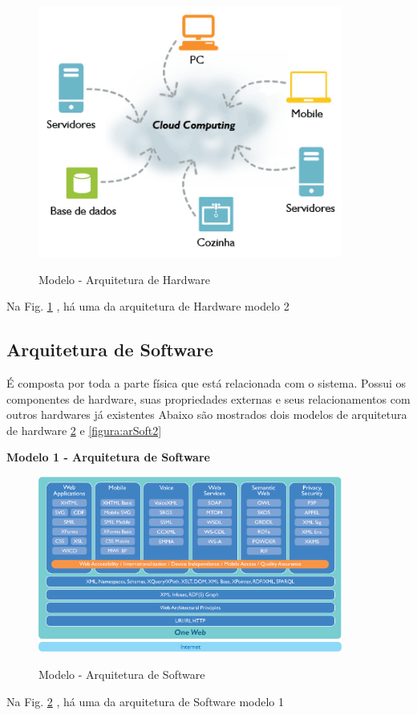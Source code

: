                 
                  \begin{figure}[H]
                 \caption{Modelo - Arquitetura de Hardware}
               \centering %
                \includegraphics[width=10cm]{analisedeProjeto/arcloud} %
                \label{figura:arcloud}
                \end{figure}
                Na Fig. \ref{figura:arcloud} , há uma da arquitetura de Hardware modelo 2
                
                
                
                  \subsection{Arquitetura de Software}
  
 
É composta por toda a parte física que está relacionada com o sistema. Possui os componentes de hardware, suas propriedades externas e seus relacionamentos com outros hardwares já existentes
Abaixo são mostrados dois modelos de arquitetura de hardware   \ref{figura:arsoft} e \ref{figura:arSoft2}
  
   \textbf{Modelo 1 - Arquitetura de Software }
  
       \begin{figure}[H]
                 \caption{Modelo - Arquitetura de Software}
               \centering %
                \includegraphics[width=10cm]{analisedeProjeto/arsoft} %
                \label{figura:arsoft}
                \end{figure}
                Na Fig. \ref{figura:arsoft} , há uma da arquitetura de Software modelo 1
                

